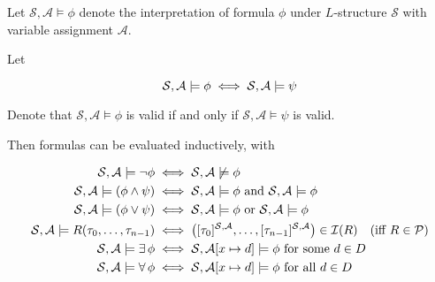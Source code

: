 \begin{remark}
    Let $\mathcal{S}, \mathcal{A} \models \phi$ denote the interpretation of formula $\phi$ 
    under $L$-structure $\mathcal{S}$ with variable assignment $\mathcal{A}$.
    
    Let
    
    \begin{equation*}
        \mathcal{S}, \mathcal{A} \models \phi \;\Longleftrightarrow\; \mathcal{S}, \mathcal{A} \models \psi
    \end{equation*}
    
    Denote that $\mathcal{S}, \mathcal{A} \models \phi$ is valid if and only if
    $\mathcal{S}, \mathcal{A} \models \psi$ is valid.
\end{remark}

\begin{definition}
    Then formulas can be evaluated inductively, with
    
    \begin{align}
        \mathcal{S}, \mathcal{A} \models \neg \phi 
            &\;\Longleftrightarrow\; \mathcal{S}, \mathcal{A} \not\models \phi \\
        \mathcal{S}, \mathcal{A} \models (\phi \land \psi)
            &\;\Longleftrightarrow\; \mathcal{S}, \mathcal{A} \models \phi
                \text{ and } \mathcal{S}, \mathcal{A} \models \phi \\
        \mathcal{S}, \mathcal{A} \models (\phi \lor \psi)
            &\;\Longleftrightarrow\; \mathcal{S}, \mathcal{A} \models \phi
                \text{ or } \mathcal{S}, \mathcal{A} \models \phi \\
        \mathcal{S}, \mathcal{A} \models R(\tau_0, \dots, \tau_{n-1})
            &\;\Longleftrightarrow\; \left(
                [\tau_0]^{\mathcal{S}, \mathcal{A}},
                \ldots, 
                [\tau_{n-1}]^{\mathcal{S}, \mathcal{A}} 
            \right) \in \mathcal{I}(R) \quad\text{(iff $R \in \mathcal{P}$)} \\
        \mathcal{S}, \mathcal{A} \models \operatorname{\exists} \phi
            &\;\Longleftrightarrow\; \mathcal{S}, \mathcal{A}[x \mapsto d] \models \phi 
            \text{ for some } d \in D \\
        \mathcal{S}, \mathcal{A} \models \operatorname{\forall} \phi
            &\;\Longleftrightarrow\; \mathcal{S}, \mathcal{A}[x \mapsto d] \models \phi
            \text{ for all } d \in D
    \end{align}
\end{definition}

